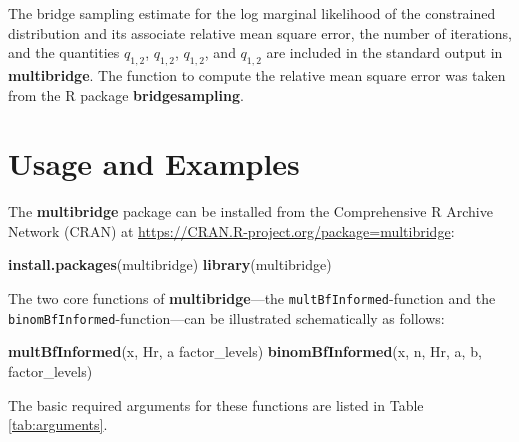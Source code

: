 \documentclass[
  english,
  man,floatsintext]{apa6}
\newenvironment{Shaded}{\begin{snugshade}}{\end{snugshade}}
\newcommand{\KeywordTok}[1]{\textcolor[rgb]{0.13,0.29,0.53}{\textbf{#1}}}
\newcommand{\NormalTok}[1]{#1}
\newcommand{\StringTok}[1]{\textcolor[rgb]{0.31,0.60,0.02}{#1}}
\begin{document}
The bridge sampling estimate for the log marginal likelihood of the constrained distribution and its associate relative mean square error, the number of iterations, and the quantities \(q_{1,2}\), \(q_{1,2}\), \(q_{1,2}\), and \(q_{1,2}\) are included in the standard output in \textbf{multibridge}. The function to compute the relative mean square error was taken from the R package \textbf{bridgesampling}.

\hypertarget{usage-and-examples}{%
\section{Usage and Examples}\label{usage-and-examples}}

The \textbf{multibridge} package can be installed from the Comprehensive R Archive Network (CRAN) at
\url{https://CRAN.R-project.org/package=multibridge}:

\begin{Shaded}
\begin{Highlighting}[]
\KeywordTok{install.packages}\NormalTok{(}\StringTok{\textquotesingle{}multibridge\textquotesingle{}}\NormalTok{)}
\KeywordTok{library}\NormalTok{(}\StringTok{\textquotesingle{}multibridge\textquotesingle{}}\NormalTok{)}
\end{Highlighting}
\end{Shaded}

The two core functions of \textbf{multibridge}---the \texttt{multBfInformed}-function and the \texttt{binomBfInformed}-function---can be illustrated schematically as follows:

\begin{Shaded}
\begin{Highlighting}[]
\KeywordTok{multBfInformed}\NormalTok{(x, Hr, a factor\_levels)}
\KeywordTok{binomBfInformed}\NormalTok{(x, n, Hr, a, b, factor\_levels)}
\end{Highlighting}
\end{Shaded}

The basic required arguments for these functions are listed in Table \ref{tab:arguments}.
\end{document}
